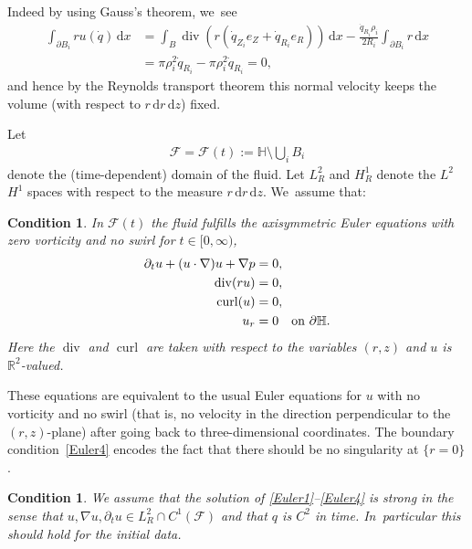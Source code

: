 \documentclass[10pt]{amsart}
\let\backslash\setminus
\newtheorem{condition}[theorem]{Condition}
\theoremstyle{definition}
\renewcommand{\div}{\operatorname{div}}
\DeclareMathOperator{\curl}{curl}
\newcommand\R{\mathbb{R}}
\newcommand\eq{=}
\newcommand\dd{\,\mathrm{d}}
\newcommand\dx{\dd x}
\newcommand\dz{\dd z}
\newcommand\dr{\dd r}
\let\de\partial
\begin{document}
Indeed by using Gauss's theorem, we~see
\begin{equation}
\begin{aligned}
\int_{\de B_i}ru(\dot{q})\dx&=\int_B \div\left(r(\dot{q}_{Z_i}e_Z+\dot{q}_{R_i}e_R)\right)\dx-\frac{\dot{q}_{R_i}\rho_i}{2R_i}\int_{\de B_i} r\dx\\
&=\pi\rho_i^2\dot{q}_{R_i}-\pi \rho_i^2\dot{q}_{R_i}=0,\label{vol fix}
\end{aligned}
\end{equation}
and hence by the Reynolds transport theorem this normal velocity keeps the volume (with respect to $r\dr\dz$) fixed.

Let
\begin{align*}
\mathcal{F}=\mathcal{F}(t):=\mathbb{H}\backslash \bigcup_i B_i
\end{align*}
denote the (time-dependent) domain of the fluid. Let $L_R^2$ and $H_R^1$ denote the $L^2$ \resp $H^1$ spaces with respect to the measure $r\dr\dz$. We~assume that:

\begin{condition}
In $\mathcal{F}(t)$ the fluid fulfills the axisymmetric Euler equations with zero vorticity and no swirl for $t\in [0,\infty)$, \ie
\begin{align}
\de_t u+(u\cdot\nabla)u+\nabla p&\eq 0,\label{Euler1}\\
\div(ru)&\eq 0,\label{Euler2}\\
\curl(u)&\eq 0,\label{Euler3}\\
u_r&\eq 0 \quad\text{\normalfont{on} $\de \mathbb{H}$.}\label{Euler4}
\end{align}
Here the $\div$ and $\curl$ are taken with respect to the variables $(r,z)$ and $u$ is $\R^2$-valued.
\end{condition}

These equations are equivalent to the usual Euler equations for $u$ with no vorticity and no swirl (that is, no velocity in the direction perpendicular to the $(r,z)$-plane) after going back to three-dimensional coordinates. The boundary condition~\eqref{Euler4} encodes the fact that there should be no singularity at $\{r=0\}$.

\begin{condition}\label{strongsol}
We assume that the solution of \eqref{Euler1}--\eqref{Euler4} is strong in the sense that $u,\nabla u,\de_t u\in L_R^2\cap C^1(\mathcal{F})$ and that $q$ is $C^2$ in time. In~particular this should hold for the initial data.
\end{condition}
\end{document}
